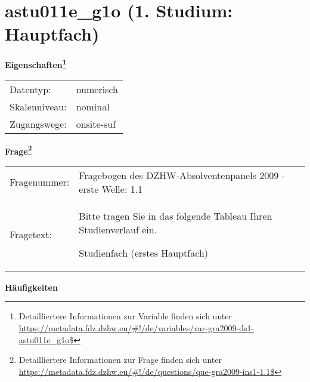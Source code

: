 
    \setcounter{footnote}{0}

    \vspace*{-1.8cm}
	\section{astu011e\_g1o (1. Studium: Hauptfach)}
	\label{section:astu011e_g1o}



    \vspace*{0.5cm}
    \noindent\textbf{Eigenschaften\footnote{Detailliertere Informationen zur Variable finden sich unter
		\url{https://metadata.fdz.dzhw.eu/\#!/de/variables/var-gra2009-ds1-astu011e_g1o$}}}\\
	\begin{tabularx}{\hsize}{@{}lX}
	Datentyp: & numerisch \\
	Skalenniveau: & nominal \\
	Zugangswege: &
	  onsite-suf
 \\
    \end{tabularx}



				\vspace*{0.5cm}
                \noindent\textbf{Frage\footnote{Detailliertere Informationen zur Frage finden sich unter
		              \url{https://metadata.fdz.dzhw.eu/\#!/de/questions/que-gra2009-ins1-1.1$}}}\\
				\begin{tabularx}{\hsize}{@{}lX}
					Fragenummer: &
					  Fragebogen des DZHW-Absolventenpanels 2009 - erste Welle:
					  1.1
 \\
					Fragetext: & Bitte tragen Sie in das folgende Tableau Ihren Studienverlauf ein.\par  Studienfach (erstes Hauptfach) \\
				\end{tabularx}





        		\vspace*{0.5cm}
                \noindent\textbf{Häufigkeiten}

